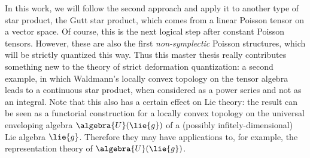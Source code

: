 In this work, we will follow the second approach and apply it to 
another type of star product, the Gutt star product, which comes from a linear 
Poisson tensor on a vector space. Of course, this is the next logical step after 
constant Poisson tensors. However, these are also the first \emph{non-symplectic}
Poisson structures, which will be strictly quantized this way. Thus this 
master thesis really contributes something new to the theory of strict 
deformation quantization: a second example, in which Waldmann's locally convex 
topology on the tensor algebra leads to a continuous star product, when 
considered as a power series and not as an integral. Note that this also has a 
certain effect on Lie theory: the result can be seen as a functorial 
construction for a locally convex topology on the universal enveloping algebra 
$\algebra{U}(\lie{g})$ of a (possibly infitely-dimensional) Lie algebra 
$\lie{g}$. Therefore they may have applications to, for example, the 
representation theory of $\algebra{U}(\lie{g})$.
